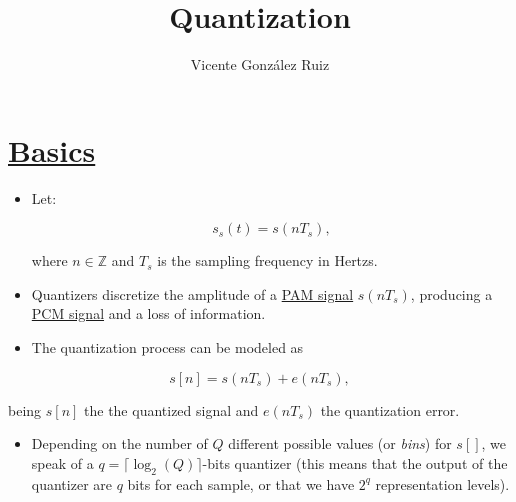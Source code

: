 
\title{Quantization}

\author{Vicente González Ruiz}

\maketitle

\section{\href{https://en.wikipedia.org/wiki/Quantization\_(signal\_processing)}{Basics}}
\begin{itemize}
\item
  Let:

  \begin{equation}
    s_s(t)=s(nT_s),
  \end{equation}

  where \(n\in{\mathbb{Z}}\) and \(T_s\) is the sampling frequency in
  Hertzs.
\item
  Quantizers discretize the amplitude of a
  \href{https://en.wikipedia.org/wiki/Pulse-amplitude_modulation}{PAM
  signal} \(s(nT_s)\), producing a
  \href{https://en.wikipedia.org/wiki/Pulse-code_modulation}{PCM signal}
  and a loss of information.
\item
  The quantization process can be modeled as
\end{itemize}

\begin{equation}
  s[n] = s(nT_s) + e(nT_s),
\end{equation}

being \(s[n]\) the the quantized signal and \(e(nT_s)\) the quantization
error.

\begin{itemize}
\tightlist
\item
  Depending on the number of \(Q\) different possible values (or
  \emph{bins}) for \(s[]\), we speak of a
  \(q=\lceil\log_2(Q)\rceil\)-bits quantizer (this means that the output
  of the quantizer are \(q\) bits for each sample, or that we have
  \(2^q\) representation levels).
\end{itemize}


